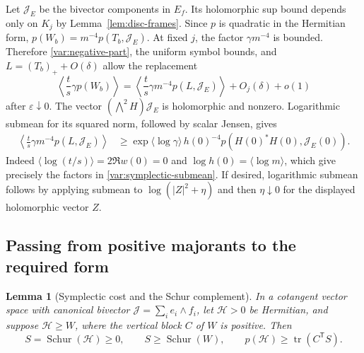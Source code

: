 \documentclass[11pt]{article}
\newtheorem{lemma}[theorem]{Lemma}
\theoremstyle{definition}
\theoremstyle{remark}
\newcommand{\eps}{\varepsilon}
\DeclareMathOperator{\tr}{tr}
\DeclareMathOperator{\Schur}{Schur}
\numberwithin{equation}{section}
\begin{document}
Let $\mathcal J_E$ be the bivector components in $E_f$.  Its holomorphic
sup bound depends only on $K_j$ by Lemma~\ref{lem:disc-frames}.
Since $p$ is quadratic in the Hermitian form,
$p(W_b)=m^{-4}p(T_b,\mathcal J_E)$.
At fixed $j$, the factor $\gamma m^{-4}$ is bounded.  Therefore
\eqref{var:negative-part}, the uniform symbol bounds, and
$L=(T_b)_++O(\delta)$ allow the replacement
\begin{equation}
 \left\langle\frac ts\gamma p(W_b)\right\rangle
 =\left\langle\frac ts\gamma m^{-4}p(L,\mathcal J_E)\right\rangle
       +O_j(\delta)+o(1)
 \label{var:positive-replacement}
\end{equation}
after $\eps\downarrow0$.
The vector $(\bigwedge^2H)\mathcal J_E$ is holomorphic and nonzero.
Logarithmic submean for its squared norm, followed by scalar Jensen,
gives
\begin{equation}
 \begin{split}
 \left\langle\frac ts\gamma m^{-4}p(L,\mathcal J_E)\right\rangle
 &\ge \exp\langle\log\gamma\rangle\,
 h(0)^{-4}p(H(0)^*H(0),\mathcal J_E(0)).
 \end{split}
 \label{var:symplectic-submean}
\end{equation}
Indeed $\langle\log(t/s)\rangle=2\Re w(0)=0$ and
$\log h(0)=\langle\log m\rangle$, which give precisely the factors
in \eqref{var:symplectic-submean}.  If desired, logarithmic submean
follows by applying submean to $\log(|Z|^2+\eta)$ and then
$\eta\downarrow0$ for the displayed holomorphic vector $Z$.

\subsection{Passing from positive majorants to the required form}

\begin{lemma}[Symplectic cost and the Schur complement]
\label{lem:symplectic-schur}
In a cotangent vector space with canonical bivector
$\mathcal J=\sum_i e_i\wedge f_i$, let $\mathcal H>0$ be Hermitian,
and suppose $\mathcal H\ge W$, where the vertical block $C$ of $W$
is positive.  Then
\begin{equation}
 S=\Schur(\mathcal H)\ge0,\qquad
 S\ge\Schur(W),\qquad p(\mathcal H)\ge\tr(C^{\mathsf T}S).
 \label{var:schur-cost}
\end{equation}
\end{lemma}
\end{document}
